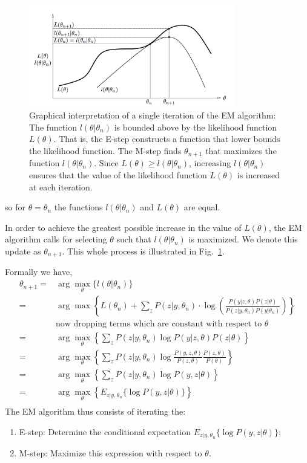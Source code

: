 \documentclass{article}  %
\begin{document}
\begin{figure}[!ht]
\includegraphics[width=0.8\textwidth,natwidth=610,natheight=642]{iter.png}
\caption{Graphical interpretation of a single iteration of the EM algorithm: The
function $l(\theta|\theta_n)$ is bounded above by the likelihood function $L(\theta)$. That is, the E-step constructs a function that lower bounds the likelihood function. The M-step finds $\theta_{n+1}$ that maximizes the function $l(\theta|\theta_n)$. Since $L(\theta) \geq l(\theta|\theta_n)$, increasing $l(\theta|\theta_n)$ ensures that the value of the likelihood function $L(\theta)$ is increased at each iteration.}
\label{fig:em}
\end{figure}%

so for $\theta=\theta_n$ the functions $l(\theta|\theta_n)$ and $L(\theta)$ are equal.

In order to achieve the greatest possible increase in the value of $L(\theta)$, the EM algorithm calls for selecting $\theta$ such that $l(\theta|\theta_n)$ is maximized. We denote this update as $\theta_{n+1}$. This whole process is illustrated in Fig.~\ref{fig:em}.


Formally we have,
\begin{align*}
\theta_{n+1} = &\arg\max _\theta \{ l(\theta|\theta_n)\} \\
 = & \arg\max\left\{L(\theta_n) +  \sum_z P(z|y,\theta_n)\cdot \log \left(\frac{P(y|z,\theta)P(z|\theta)}{P(z|y,\theta_n)P(y|\theta_n)} \right)\right\}\\
 & \text {now dropping terms which are constant with respect to $\theta$}\\
 = & \arg\max_\theta \left\{ \sum_z P(z|y,\theta_n) \log P(y|z,\theta) P(z|\theta)  \right\}\\
 = & \arg\max_\theta \left\{ \sum_z P(z|y,\theta_n) \log \frac{P(y,z,\theta)}{P(z,\theta)} \frac{P(z,\theta)}{P(\theta)} \right\}\\
  = & \arg\max_\theta \left\{ \sum_z P(z|y,\theta_n) \log P(y,z|\theta) \right\}\\
\label{eqn:em}  = & \arg\max_\theta \left\{ E_{z|y,\theta_n} \{\log P(y,z|\theta)\} \right\}\\
\end{align*}
The EM algorithm thus consists of iterating the:
\begin{enumerate}
\item E-step: Determine the conditional expectation $E_{z|y,\theta_n} \{\log P(y,z|\theta)\}$;
\item M-step: Maximize this expression with respect to $\theta$.
\end{enumerate}
\end{document}
